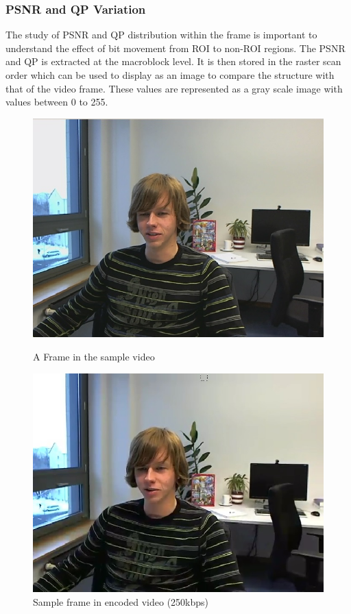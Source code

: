 \documentclass[11pt]{article} %
\begin{document}
\subsubsection{PSNR and QP Variation}
The study of PSNR and QP distribution within the frame is important to understand the effect of bit movement from ROI to non-ROI regions. The PSNR and QP is extracted at the macroblock level. It is then stored in the raster scan order which can be used to display as  an image to compare the structure with that of the video frame. These values are represented as a gray scale image with values between 0 to 255. 

\begin{figure}[!h]
    \centering
    \includegraphics[scale=0.5]{PaulDefault120}
    \caption{A Frame in the sample video}
    \label{fig:PaulDefault120}
    \includegraphics[scale=0.5]{PaulDefault120_91250kbps}
    \caption{Sample frame in encoded video (250kbps)}
    \label{fig:PaulDefaultencoded}
\end{figure} 
\end{document}
